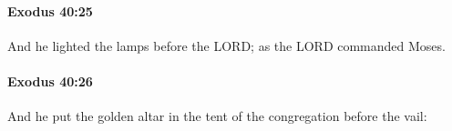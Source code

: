 		\paragraph{Exodus 40:25} %
			\label{EXODUS-40-25}

			And he lighted the lamps before the LORD; as the LORD commanded Moses.


		\paragraph{Exodus 40:26} %
			\label{EXODUS-40-26}

			And he put the golden altar in the tent of the congregation before the vail:


